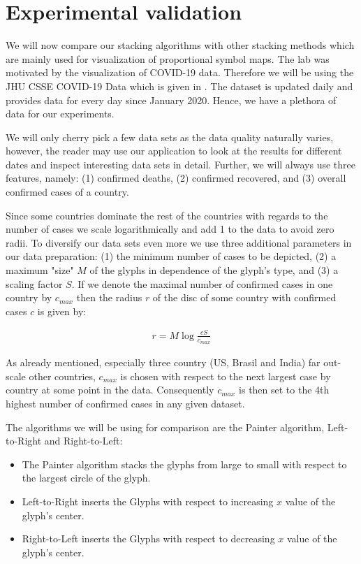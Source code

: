 \documentclass[a4paper,11pt]{article}
\begin{document}
\section{Experimental validation}

We will now compare our stacking algorithms with other stacking methods which are mainly used for visualization of proportional symbol maps. The lab was motivated by the visualization of COVID-19 data. Therefore we will be using the JHU CSSE COVID-19 Data which is given in \cite{data}. The dataset is updated daily and provides data for every day since January 2020. Hence, we have a plethora of data for our experiments.

We will only cherry pick a few data sets as the data quality naturally varies, however, the reader may use our application to look at the results for different dates and inspect interesting data sets in detail. Further, we will always use three features, namely: (1) confirmed deaths, (2) confirmed recovered, and (3) overall confirmed cases of a country.

Since some countries dominate the rest of the countries with regards to the number of cases we scale logarithmically and add 1 to the data to avoid zero radii. To diversify our data sets even more we use three additional parameters in our data preparation: (1) the minimum number of cases to be depicted, (2) a maximum "size" $M$ of the glyphs in dependence of the glyph's type, and (3) a scaling factor $S$. If we denote the maximal number of confirmed cases in one country by $c_{max}$ then the radius $r$ of the disc of some country with confirmed cases $c$ is given by:

\begin{align*}
  r=M\log\frac{c S}{c_{max}}
\end{align*}

As already mentioned, especially three country (US, Brasil and India) far out-scale other countries, $c_{max}$ is chosen with respect to the next largest case by country at some point in the data. Consequently $c_{max}$ is then set to the 4th highest number of confirmed cases in any given dataset.

The algorithms we will be using for comparison are the Painter algorithm, Left-to-Right and Right-to-Left:

\begin{itemize}
  \item The Painter algorithm stacks the glyphs from large to small with respect to the largest circle of the glyph.
  \item Left-to-Right inserts the Glyphs with respect to increasing $x$ value of the glyph's center.
  \item Right-to-Left inserts the Glyphs with respect to decreasing $x$ value of the glyph's center.
\end{itemize}
\end{document}
